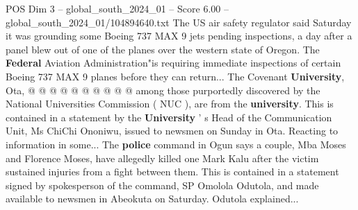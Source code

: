 \begin{textsample}{POS Dim 3 – global\_south\_2024\_01 – Score 6.00 – global\_south\_2024\_01/104894640.txt}
The US air safety regulator said Saturday it was grounding some Boeing 737 MAX 9 jets pending inspections, a day after a panel blew out of one of the planes over the western state of Oregon.
The \textbf{Federal} Aviation Administration"is requiring immediate inspections of certain Boeing 737 MAX 9 planes before they can return...
The Covenant \textbf{University}, Ota, @ @ @ @ @ @ @ @ @ @ among those purportedly discovered by the National Universities Commission ( NUC ), are from the \textbf{university}.
This is contained in a statement by the \textbf{University} ' s Head of the Communication Unit, Ms ChiChi Ononiwu, issued to newsmen on Sunday in Ota.
Reacting to information in some...
The \textbf{police} command in Ogun says a couple, Mba Moses and Florence Moses, have allegedly killed one Mark Kalu after the victim sustained injuries from a fight between them.
This is contained in a statement signed by spokesperson of the command, SP Omolola Odutola, and made available to newsmen in Abeokuta on Saturday.
Odutola explained...

\end{textsample}

